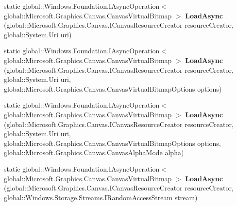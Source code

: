 \begin{DoxyCompactItemize}
\item 
\mbox{\label{class_microsoft_1_1_graphics_1_1_canvas_1_1_canvas_virtual_bitmap_ad38275a64145b2d51079b6c5e251fab4}} 
static global\+::\+Windows.\+Foundation.\+I\+Async\+Operation$<$ global\+::\+Microsoft.\+Graphics.\+Canvas.\+Canvas\+Virtual\+Bitmap $>$ {\bfseries Load\+Async} (global\+::\+Microsoft.\+Graphics.\+Canvas.\+I\+Canvas\+Resource\+Creator resource\+Creator, global\+::\+System.\+Uri uri)
\item 
\mbox{\label{class_microsoft_1_1_graphics_1_1_canvas_1_1_canvas_virtual_bitmap_acd074c002643745470070fedca4bc142}} 
static global\+::\+Windows.\+Foundation.\+I\+Async\+Operation$<$ global\+::\+Microsoft.\+Graphics.\+Canvas.\+Canvas\+Virtual\+Bitmap $>$ {\bfseries Load\+Async} (global\+::\+Microsoft.\+Graphics.\+Canvas.\+I\+Canvas\+Resource\+Creator resource\+Creator, global\+::\+System.\+Uri uri, global\+::\+Microsoft.\+Graphics.\+Canvas.\+Canvas\+Virtual\+Bitmap\+Options options)
\item 
\mbox{\label{class_microsoft_1_1_graphics_1_1_canvas_1_1_canvas_virtual_bitmap_accb66d38d50f8d67a23664ce8819c262}} 
static global\+::\+Windows.\+Foundation.\+I\+Async\+Operation$<$ global\+::\+Microsoft.\+Graphics.\+Canvas.\+Canvas\+Virtual\+Bitmap $>$ {\bfseries Load\+Async} (global\+::\+Microsoft.\+Graphics.\+Canvas.\+I\+Canvas\+Resource\+Creator resource\+Creator, global\+::\+System.\+Uri uri, global\+::\+Microsoft.\+Graphics.\+Canvas.\+Canvas\+Virtual\+Bitmap\+Options options, global\+::\+Microsoft.\+Graphics.\+Canvas.\+Canvas\+Alpha\+Mode alpha)
\item 
\mbox{\label{class_microsoft_1_1_graphics_1_1_canvas_1_1_canvas_virtual_bitmap_a56e5e79a80dccfdc011f98e647de9bcf}} 
static global\+::\+Windows.\+Foundation.\+I\+Async\+Operation$<$ global\+::\+Microsoft.\+Graphics.\+Canvas.\+Canvas\+Virtual\+Bitmap $>$ {\bfseries Load\+Async} (global\+::\+Microsoft.\+Graphics.\+Canvas.\+I\+Canvas\+Resource\+Creator resource\+Creator, global\+::\+Windows.\+Storage.\+Streams.\+I\+Random\+Access\+Stream stream)
\item 
\mbox{\label{class_microsoft_1_1_graphics_1_1_canvas_1_1_canvas_virtual_bitmap_a8cdd19fd36f49f203d6c0998ace732d1}} 

\end{DoxyCompactItemize}

